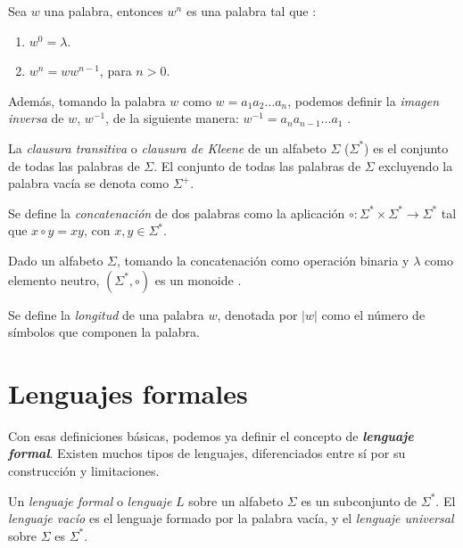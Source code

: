 Sea $w$ una palabra, entonces $w^n$ es una palabra tal que \cite{Yu1997}:
\begin{enumerate}[i]
    \item $w^0=\lambda$.
    \item $w^n=ww^{n-1}$, para $n>0$.
\end{enumerate}
Además, tomando la palabra $w$ como $w=a_1a_2\dotsc a_n$, podemos definir la \textit{imagen inversa} de $w$, 
$w^{-1}$, de la siguiente manera: $w^{-1}=a_na_{n-1}\dotsc a_1$ \cite{Becerra2018}.

\begin{definicion} La \textit{clausura transitiva} o \textit{clausura de Kleene}
de un alfabeto $\Sigma$ ($\Sigma^*$) es el conjunto de todas las palabras de $\Sigma$. El conjunto de todas las palabras
de $\Sigma$ excluyendo la palabra vacía se denota como $\Sigma^+$.
\end{definicion}
\begin{definicion}[Concatenación] Se define la \textit{concatenación} de dos palabras como la aplicación
$\circ:\Sigma^*\times\Sigma^*\to\Sigma^*$ tal que $x\circ y=xy$, con $x, y\in\Sigma^*$.
\end{definicion}

Dado un alfabeto $\Sigma$, tomando la concatenación como operación binaria y $\lambda$ como elemento neutro,
$(\Sigma^*, \circ)$ es un monoide \cite{Mateescu1997}.

\begin{definicion}[Longitud] Se define la \textit{longitud} de una palabra $w$, denotada por $|w|$ como el número de
símbolos que componen la palabra.
\end{definicion}

\section{Lenguajes formales}

Con esas definiciones básicas, podemos ya definir el concepto de \textbf{\textit{lenguaje formal}}. Existen muchos 
tipos de lenguajes, diferenciados entre sí por su construcción y limitaciones.

\begin{definicion} Un \textit{lenguaje formal} o \textit{lenguaje} $L$ sobre un alfabeto $\Sigma$ es
un subconjunto de $\Sigma^*$. El \textit{lenguaje vacío} es el lenguaje formado por la palabra vacía, y el
\textit{lenguaje universal} sobre $\Sigma$ es $\Sigma^*$.
\end{definicion}

